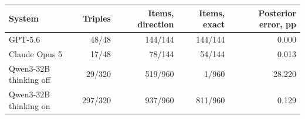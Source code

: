 \begin{tabular}{lrrrr}
\toprule
System & Triples & Items, direction & Items, exact & Posterior error, pp \\
\midrule
GPT-5.6 & 48/48 & 144/144 & 144/144 & 0.000 \\
Claude Opus 5 & 17/48 & 78/144 & 54/144 & 0.013 \\
Qwen3-32B thinking off & 29/320 & 519/960 & 1/960 & 28.220 \\
Qwen3-32B thinking on & 297/320 & 937/960 & 811/960 & 0.129 \\
\bottomrule
\end{tabular}
